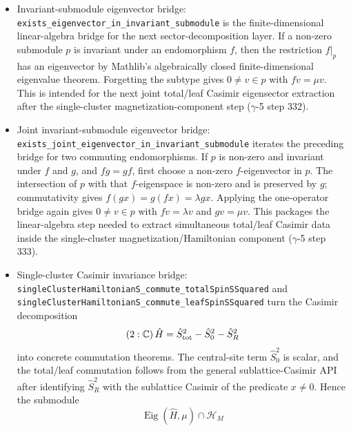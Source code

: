 \documentclass[a4paper,11pt]{article}
\begin{document}
\begin{itemize}
        \texttt{singleClusterHamiltonianS\_eigenvec\_exists\_weight\_component}
        extracts a non-zero magnetization component from any non-zero
        single-cluster eigenvector, preserving the same energy
        ($\gamma$-5 step 331).
  \item Invariant-submodule eigenvector bridge:
        \texttt{exists\_eigenvector\_in\_invariant\_submodule}
        is the finite-dimensional linear-algebra bridge for the next
        sector-decomposition layer.  If a non-zero submodule \(p\) is invariant
        under an endomorphism \(f\), then the restriction \(f|_p\) has an
        eigenvector by Mathlib's algebraically closed finite-dimensional
        eigenvalue theorem.  Forgetting the subtype gives \(0\ne v\in p\)
        with \(f v=\mu v\).  This is intended for the next joint total/leaf
        Casimir eigensector extraction after the single-cluster
        magnetization-component step ($\gamma$-5 step 332).
  \item Joint invariant-submodule eigenvector bridge:
        \texttt{exists\_joint\_eigenvector\_in\_invariant\_submodule}
        iterates the preceding bridge for two commuting endomorphisms.  If
        \(p\) is non-zero and invariant under \(f\) and \(g\), and \(fg=gf\),
        first choose a non-zero \(f\)-eigenvector in \(p\).  The intersection
        of \(p\) with that \(f\)-eigenspace is non-zero and is preserved by
        \(g\); commutativity gives \(f(gx)=g(fx)=\lambda gx\).  Applying the
        one-operator bridge again gives \(0\ne v\in p\) with
        \(f v=\lambda v\) and \(g v=\mu v\).  This packages the linear-algebra
        step needed to extract simultaneous total/leaf Casimir data inside the
        single-cluster magnetization/Hamiltonian component ($\gamma$-5 step
        333).
  \item Single-cluster Casimir invariance bridge:
        \texttt{singleClusterHamiltonianS\_commute\_totalSpinSSquared}
        and
        \texttt{singleClusterHamiltonianS\_commute\_leafSpinSSquared}
        turn the Casimir decomposition
        \[
          (2:\mathbb C)\,\hat H
          = \hat S_{\rm tot}^2 - \hat S_0^2 - \hat S_R^2
        \]
        into concrete commutation theorems.  The central-site term
        \(\hat S_0^2\) is scalar, and the total/leaf commutation follows from
        the general sublattice-Casimir API after identifying
        \(\hat S_R^2\) with the sublattice Casimir of the predicate \(x\ne 0\).
        Hence the submodule
        \[
          \operatorname{Eig}(\hat H,\mu) \cap \mathcal H_M
        \]

\end{itemize}
\end{document}
